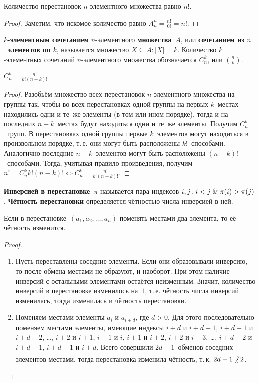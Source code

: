 \begin{consequent}
Количество перестановок $n$-элементного множества равно $n!$.
\end{consequent}
\begin{proof}
Заметим, что искомое количество равно $A_n^n = \frac{n!}{0!} = n!$.
\end{proof}

 \textbf{$k$-элементным сочетанием} $n$-элементного \textbf{множества~$A$}, или \textbf{сочетанием из $n$~элементов по $k$}, называется множество $X \subseteq A \colon |X| = k$.
Количество $k$-элементных сочетаний $n$-элементного множества обозначается $C_n^k$, или $\binom{n}{k}$.

\begin{statement}
$\displaystyle C_n^k = \frac{n!}{k! (n - k)!}$
\end{statement}
\begin{proof}
Разобьём множество всех перестановок $n$-элементного множества на группы так, чтобы во всех перестановках одной группы на первых $k$~местах находились одни и те~же элементы (в том или ином порядке), тогда и на последних $n - k$~местах будут находиться одни и те~же элементы.
Получим $C_n^k$~групп.
В перестановках одной группы первые $k$~элементов могут находиться в произвольном порядке, т.\,е. они могут быть расположены $k!$~способами.
Аналогично последние $n - k$~элементов могут быть расположены $(n - k)!$~способами.
Тогда, учитывая правило произведения, получим $\displaystyle n! = C_n^k k! (n - k)! \Leftrightarrow C_n^k = \frac{n!}{k! (n - k)!}$.
\end{proof}

 \textbf{Инверсией в перестановке~$\pi$} называется пара индексов $i, j \colon i < j \mathrel{\&} \pi(i) > \pi(j)$.
\textbf{Чётность перестановки} определяется чётностью числа инверсией в ней.

\begin{statement}
\label{st:parity_of_permutation}
Если в перестановке~$(a_1, a_2, \ldots, a_n)$ поменять местами два элемента, то её чётность изменится.
\end{statement}
\begin{proof}
\begin{enumerate}
	\item Пусть переставлены соседние элементы.
	Если они образовывали инверсию, то после обмена местами не образуют, и наоборот.
	При этом наличие инверсий с остальными элементами остаётся неизменным.
	Значит, количество инверсий в перестановке изменилось на~$1$, т.\,е. чётность числа инверсий изменилась, тогда изменилась и чётность перестановки.
	
	\item Поменяем местами элементы $a_i$ и $a_{i+d}$, где $d > 0$.
	Для этого последовательно поменяем местами элементы, имеющие индексы $i+d$ и $i+d-1$, $i+d-1$ и $i+d-2$, \ldots, $i+2$ и $i+1$, $i+1$ и $i$, $i+1$ и $i+2$, $i+2$ и $i+3$, \ldots, $i+d-2$ и $i+d-1$, $i+d-1$ и $i+d$.
	Всего совершили $2d - 1$~обменов соседних элементов местами, тогда перестановка изменила чётность, т.\,к. $2d - 1 \notmult 2$.
\end{enumerate}
\end{proof}